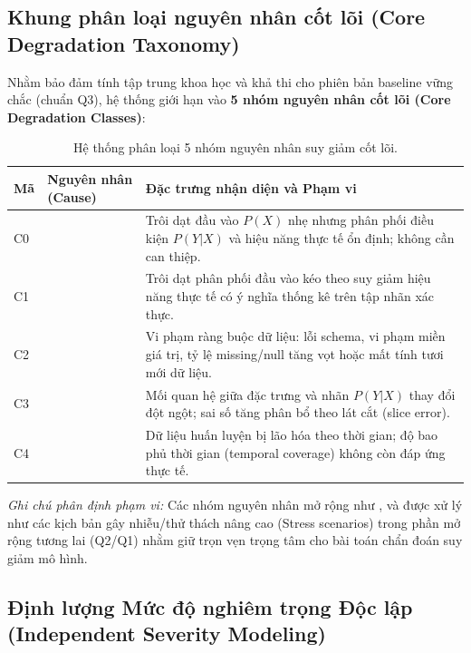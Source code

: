 \subsection{Khung phân loại nguyên nhân cốt lõi (Core Degradation Taxonomy)}

Nhằm bảo đảm tính tập trung khoa học và khả thi cho phiên bản baseline vững chắc (chuẩn Q3), hệ thống giới hạn vào \textbf{5 nhóm nguyên nhân cốt lõi (Core Degradation Classes)}:

\begin{table}[ht]
\centering
\caption{Hệ thống phân loại 5 nhóm nguyên nhân suy giảm cốt lõi.}\label{tab:cause-taxonomy}
\begin{tabularx}{\linewidth}{@{}C{1.0cm} L{3.8cm} Y@{}}
\toprule
\textbf{Mã} & \textbf{Nguyên nhân (Cause)} & \textbf{Đặc trưng nhận diện và Phạm vi} \\
\midrule
C0 &  & Trôi dạt đầu vào $P(X)$ nhẹ nhưng phân phối điều kiện $P(Y|X)$ và hiệu năng thực tế ổn định; không cần can thiệp. \\
\addlinespace
C1 &  & Trôi dạt phân phối đầu vào kéo theo suy giảm hiệu năng thực tế có ý nghĩa thống kê trên tập nhãn xác thực. \\
\addlinespace
C2 &  & Vi phạm ràng buộc dữ liệu: lỗi schema, vi phạm miền giá trị, tỷ lệ missing/null tăng vọt hoặc mất tính tươi mới dữ liệu. \\
\addlinespace
C3 &  & Mối quan hệ giữa đặc trưng và nhãn $P(Y|X)$ thay đổi đột ngột; sai số tăng phân bổ theo lát cắt (slice error). \\
\addlinespace
C4 &  & Dữ liệu huấn luyện bị lão hóa theo thời gian; độ bao phủ thời gian (temporal coverage) không còn đáp ứng thực tế. \\
\bottomrule
\end{tabularx}
\end{table}

\textit{Ghi chú phân định phạm vi:} Các nhóm nguyên nhân mở rộng như ,  và  được xử lý như các kịch bản gây nhiễu/thử thách nâng cao (Stress scenarios) trong phần mở rộng tương lai (Q2/Q1) nhằm giữ trọn vẹn trọng tâm cho bài toán chẩn đoán suy giảm mô hình.

\subsection{Định lượng Mức độ nghiêm trọng Độc lập (Independent Severity Modeling)}

